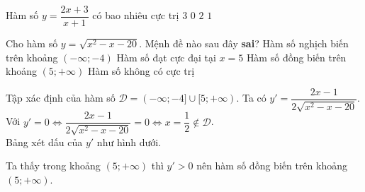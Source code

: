 \begin{ex}%
    Hàm số $y=\dfrac{2x+3}{x+1}$ có bao nhiêu cực trị
    \choice
    {$3$}
    {\True $0$}
    {$2$}
    {$1$}
\end{ex}
\begin{ex}%
    Cho hàm số $y=\sqrt{x^2-x-20}$. Mệnh đề nào sau đây \textbf{sai}?
    \choice
    {Hàm số nghịch biến trên khoảng $(-\infty;-4)$}
    {Hàm số đạt cực đại tại $x=5$}
    {\True Hàm số đồng biến trên khoảng $(5;+\infty)$}
    {Hàm số không có cực trị}
    \loigiai
    {
        Tập xác định của hàm số $\mathscr{D}=(-\infty;-4]\cup[5;+\infty)$. Ta có $y'=\dfrac{2x-1}{2\sqrt{x^2-x-20}}$.\\
        Với $y'=0\Leftrightarrow \dfrac{2x-1}{2\sqrt{x^2-x-20}}=0\Leftrightarrow x=\dfrac{1}{2}\not\in\mathscr{D}$.\\
        Bảng xét dấu của $y'$ như hình dưới.
        \begin{center}
        \end{center}
        Ta thấy trong khoảng $(5;+\infty)$ thì $y'>0$ nên hàm số đồng biến trên khoảng $(5;+\infty)$.
    }
\end{ex}


